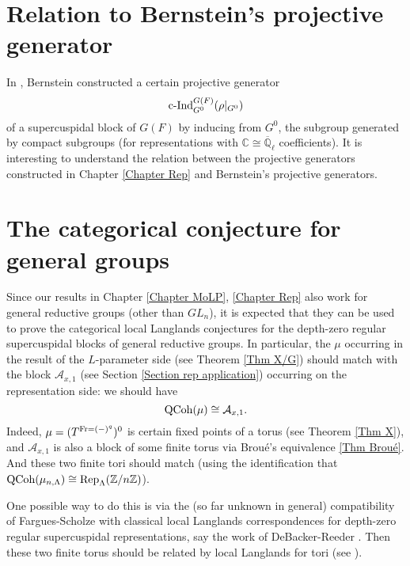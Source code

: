 \section{Relation to Bernstein's projective generator}

In \cite[p46, Section 3.3]{bernsteindraft}, Bernstein constructed a certain projective generator $$\operatorname{\operatorname{c-Ind}}_{G^0}^{G(F)}(\rho|_{G^0})$$
of a supercuspidal block of $G(F)$ by inducing from $G^0$, the subgroup generated by compact subgroups (for representations with $\mathbb{C} \cong \overline{\mathbb{Q}}_{\ell}$ coefficients). It is interesting to understand the relation between the projective generators constructed in Chapter \ref{Chapter Rep} and Bernstein's projective generators.

\section{The categorical conjecture for general groups}

Since our results in Chapter \ref{Chapter MoLP}, \ref{Chapter Rep} also work for general reductive groups (other than $GL_n$), it is expected that they can be used to prove the categorical local Langlands conjectures for the depth-zero regular supercuspidal blocks of general reductive groups. In particular, the $\mu$ occurring in the result
of the $L$-parameter side (see Theorem \ref{Thm X/G}) should match with the block $\mathcal{A}_{x,1}$ (see Section \ref{Section rep application}) occurring on the representation side: we should have
$$\operatorname{\operatorname{QCoh}}(\mu) \cong \mathcal{A}_{x,1}.$$
Indeed, $\mu=(T^{\operatorname{Fr}=(-)^q})^0$ is certain fixed points of a torus (see Theorem \ref{Thm X}), and $\mathcal{A}_{x,1}$ is also a block of some finite torus via Broué's equivalence \ref{Thm Broué}. And these two finite tori should match (using the identification that $\operatorname{\operatorname{QCoh}}(\mu_{n, \Lambda}) \cong \operatorname{\operatorname{Rep}}_{\Lambda}(\mathbb{Z}/n\mathbb{Z})$).

One possible way to do this is via the (so far unknown in general) compatibility of Fargues-Scholze with classical local Langlands correspondences for depth-zero regular supercuspidal representations, say the work of DeBacker-Reeder \cite{debacker2009depth}. Then these two finite torus should be related by local Langlands for tori (see \cite[Section 4.3]{debacker2009depth}). 


	
